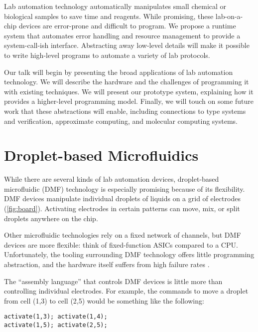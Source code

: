 \documentclass[
  10pt,
  a4paper,
  twocolumn,
]{article}
\title{\mytitle}
\author{\myauthors
\\ \small Paul G. Allen School for Computer Science and Engineering
\\ \small University of Washington}
\date{}
\begin{document}
\maketitle

Lab automation technology automatically manipulates small chemical or biological samples to save time and reagents.
While promising, these lab-on-a-chip devices are error-prone and difficult to program.
We propose a runtime system that automates error handling and resource management to provide a system-call-ish interface.
Abstracting away low-level details will make it possible to write high-level programs to automate a variety of lab protocols.

Our talk will begin by presenting the broad applications of lab automation technology.
We will describe the hardware and the challenges of programming it with existing techniques.
We will present our prototype system, explaining how it provides a higher-level programming model.
Finally, we will touch on some future work that these abstractions will enable, including connections to type systems and verification, approximate computing, and molecular computing systems.

\section*{Droplet-based Microfluidics}

While there are several kinds of lab automation devices,
droplet-based microfluidic (DMF) technology is especially promising because of its flexibility.
DMF devices manipulate individual droplets of liquids on a grid of electrodes (\autoref{fig:board}).
Activating electrodes in certain patterns can move, mix, or split droplets anywhere on the chip.

Other microfluidic technologies rely on a fixed network of channels, but DMF
devices are more flexible: think of fixed-function ASICs compared to a CPU.
Unfortunately, the tooling surrounding DMF technology offers little programming abstraction,
and the hardware itself suffers from high failure rates \cite{dmf-review}.

The ``assembly language'' that controls DMF devices is little more than controlling individual electrodes.
For example, the commands to move a droplet from cell (1,3) to cell (2,5) would be something like the following:

\begin{verbatim}
activate(1,3); activate(1,4);
activate(1,5); activate(2,5);
\end{verbatim}
\end{document}
